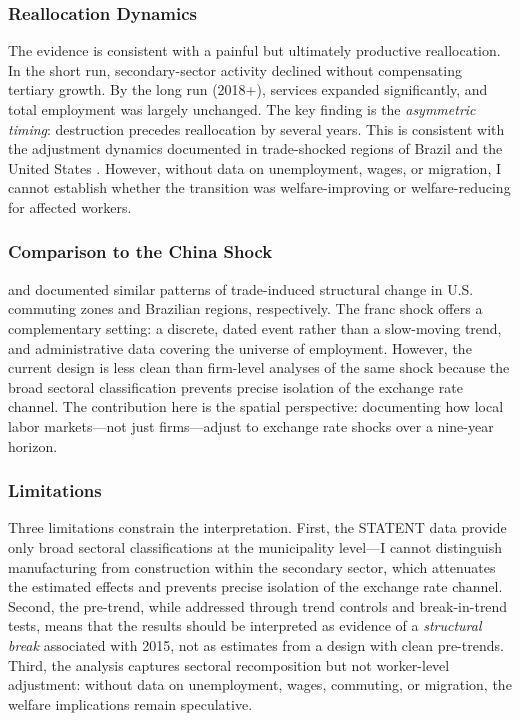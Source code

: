 \documentclass[12pt]{article}
\begin{document}
\subsubsection*{Reallocation Dynamics} The evidence is consistent with a painful but ultimately productive reallocation. In the short run, secondary-sector activity declined without compensating tertiary growth. By the long run (2018+), services expanded significantly, and total employment was largely unchanged. The key finding is the \textit{asymmetric timing}: destruction precedes reallocation by several years. This is consistent with the adjustment dynamics documented in trade-shocked regions of Brazil \citep{dix-carneiro2017trade} and the United States \citep{autor2021work}. However, without data on unemployment, wages, or migration, I cannot establish whether the transition was welfare-improving or welfare-reducing for affected workers.

\subsubsection*{Comparison to the China Shock} \citet{autor2013china} and \citet{dix-carneiro2017trade} documented similar patterns of trade-induced structural change in U.S. commuting zones and Brazilian regions, respectively. The franc shock offers a complementary setting: a discrete, dated event rather than a slow-moving trend, and administrative data covering the universe of employment. However, the current design is less clean than firm-level analyses of the same shock \citep{kaufmann2018labor, auer2021exchange} because the broad sectoral classification prevents precise isolation of the exchange rate channel. The contribution here is the spatial perspective: documenting how local labor markets---not just firms---adjust to exchange rate shocks over a nine-year horizon.

\subsubsection*{Limitations} Three limitations constrain the interpretation. First, the STATENT data provide only broad sectoral classifications at the municipality level---I cannot distinguish manufacturing from construction within the secondary sector, which attenuates the estimated effects and prevents precise isolation of the exchange rate channel. Second, the pre-trend, while addressed through trend controls and break-in-trend tests, means that the results should be interpreted as evidence of a \textit{structural break} associated with 2015, not as estimates from a design with clean pre-trends. Third, the analysis captures sectoral recomposition but not worker-level adjustment: without data on unemployment, wages, commuting, or migration, the welfare implications remain speculative.
\end{document}
